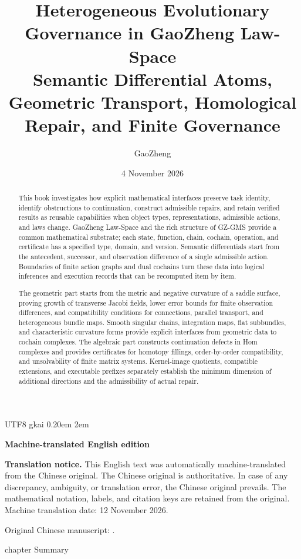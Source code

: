\documentclass[12pt,a4paper,openany,notitlepage]{report}
\title{\bfseries Heterogeneous Evolutionary Governance in GaoZheng Law-Space\\[0.65em]\large Semantic Differential Atoms, Geometric Transport, Homological Repair, and Finite Governance}
\author{GaoZheng}
\date{4 November 2026}
\theoremstyle{plain}
\theoremstyle{definition}
\theoremstyle{remark}
\begin{document}
\begin{CJK*}
{UTF8} {gkai}  \begingroup {} \setlength {\parskip} {0.20em} \setlength {\parindent} {2em} \maketitle
\begin{center}\small\bfseries Machine-translated English edition\end{center}
\noindent\textbf{Translation notice.} This English text was automatically machine-translated from the Chinese original. The Chinese original is authoritative. In case of any discrepancy, ambiguity, or translation error, the Chinese original prevails. The mathematical notation, labels, and citation keys are retained from the original. Machine translation date: 12 November 2026.\par
\noindent Original Chinese manuscript: .\par\medskip
 \thispagestyle {empty}  {} {chapter} { Summary }\begin{abstract}
This book investigates how explicit mathematical interfaces preserve task identity, identify obstructions to continuation, construct admissible repairs, and retain verified results as reusable capabilities when object types, representations, admissible actions, and laws change. GaoZheng Law-Space and the rich structure of GZ-GMS provide a common mathematical substrate; each state, function, chain, cochain, operation, and certificate has a specified type, domain, and version. Semantic differentials start from the antecedent, successor, and observation difference of a single admissible action. Boundaries of finite action graphs and dual cochains turn these data into logical inferences and execution records that can be recomputed item by item.

The geometric part starts from the metric and negative curvature of a saddle surface, proving growth of transverse Jacobi fields, lower error bounds for finite observation differences, and compatibility conditions for connections, parallel transport, and heterogeneous bundle maps. Smooth singular chains, integration maps, flat subbundles, and characteristic curvature forms provide explicit interfaces from geometric data to cochain complexes. The algebraic part constructs continuation defects in Hom complexes and provides certificates for homotopy fillings, order-by-order compatibility, and unsolvability of finite matrix systems. Kernel-image quotients, compatible extensions, and executable prefixes separately establish the minimum dimension of additional directions and the admissibility of actual repair.


\end{abstract}
\end{CJK*}
\end{document}

